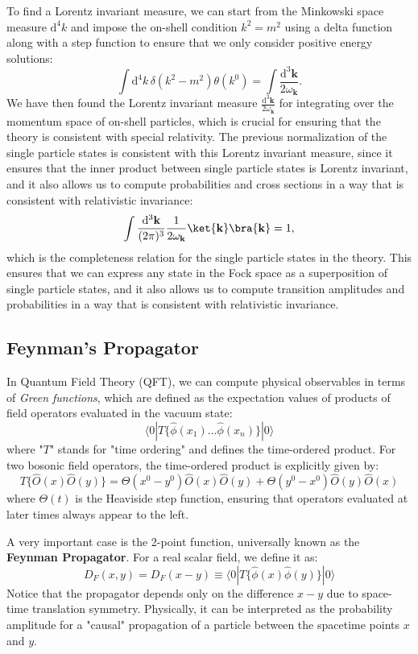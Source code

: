 \begin{remark}
    To find a Lorentz invariant measure, we can start from the Minkowski space measure \(\mathrm{d}^4 k\) and impose the on-shell condition \(k^2 = m^2\) using a delta function along with a step function to ensure that we only consider positive energy solutions:
    \[
        \int \mathrm{d}^4 k \, \delta(k^2 - m^2) \theta(k^0) = \int \frac{\mathrm{d}^3 \mathbf{k}}{2 \omega_{\mathbf{k}}}.
    \]
    We have then found the Lorentz invariant measure \(\frac{\mathrm{d}^3 \mathbf{k}}{2 \omega_{\mathbf{k}}}\) for integrating over the momentum space of on-shell particles, which is crucial for ensuring that the theory is consistent with special relativity. The previous normalization of the single particle states is consistent with this Lorentz invariant measure, since it ensures that the inner product between single particle states is Lorentz invariant, and it also allows us to compute probabilities and cross sections in a way that is consistent with relativistic invariance:
    \[
        \int \frac{\mathrm{d}^3 \mathbf{k}}{(2\pi)^3} \frac{1}{2 \omega_{\mathbf{k}}} \ket{\mathbf{k}} \bra{\mathbf{k}} = 1,
    \]
    which is the completeness relation for the single particle states in the theory. This ensures that we can express any state in the Fock space as a superposition of single particle states, and it also allows us to compute transition amplitudes and probabilities in a way that is consistent with relativistic invariance.
\end{remark}

\subsection{Feynman's Propagator}

In Quantum Field Theory (QFT), we can compute physical observables in terms of \textit{Green functions}, which are defined as the expectation values of products of field operators evaluated in the vacuum state:
\[
    \langle 0 | T\{ \hat{\phi}(x_1) \dots \hat{\phi}(x_n) \} | 0 \rangle
\]
where "$T$" stands for "time ordering" and defines the time-ordered product. For two bosonic field operators, the time-ordered product is explicitly given by:
\[
    T \{ \hat{O}(x) \hat{O}(y) \} = \Theta(x^0 - y^0) \hat{O}(x) \hat{O}(y) + \Theta(y^0 - x^0) \hat{O}(y) \hat{O}(x)
\]
where $\Theta(t)$ is the Heaviside step function, ensuring that operators evaluated at later times always appear to the left.

A very important case is the 2-point function, universally known as the \textbf{Feynman Propagator}. For a real scalar field, we define it as:
\[
    D_F(x, y) = D_F(x - y) \equiv \langle 0 | T \{ \hat{\phi}(x) \hat{\phi}(y) \} | 0 \rangle
\]
Notice that the propagator depends only on the difference $x-y$ due to space-time translation symmetry. Physically, it can be interpreted as the probability amplitude for a "causal" propagation of a particle between the spacetime points $x$ and $y$.

